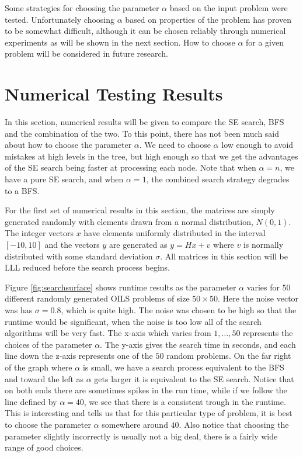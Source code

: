 \documentclass[12pt,Bold,letterpaper]{mcgilletdclass}
\newcommand{\vsp}{\vspace{\baselineskip}}
\begin{document}
Some strategies for choosing the parameter $\alpha$ based on the input problem were tested. Unfortunately choosing $\alpha$ based on properties of the problem has proven to be somewhat difficult, although it can be chosen reliably through numerical experiments as will be shown in the next section. How to choose $\alpha$ for a given problem will be considered in future research.

\vsp \section{Numerical Testing Results} \label{sub:SearchResults}
In this section, numerical results will be given to compare the SE search, BFS and the combination of the two. To this point, there has not been much said about how to choose the parameter $\alpha$. We need to choose $\alpha$ low enough to avoid mistakes at high levels in the tree, but high enough so that we get the advantages of the SE search being faster at processing each node. Note that when $\alpha = n$, we have a pure SE search, and when $\alpha = 1$, the combined search strategy degrades to a BFS. 

For the first set of numerical results in this section, the matrices are simply generated randomly with elements drawn from a normal distribution, $N(0,1)$. The integer vectors $x$ have elements uniformly distributed in the interval $[-10,10]$ and the vectors $y$ are generated as $y = Hx+v$ where $v$ is normally distributed with some standard deviation $\sigma$. All matrices in this section will be LLL reduced before the search process begins.

Figure \ref{fig:searchsurface} shows runtime results as the parameter $\alpha$ varies for $50$ different randomly generated OILS problems of size $50 \times 50$. Here the noise vector was has $\sigma = 0.8$, which is quite high. The noise was chosen to be high so that the runtime would be significant, when the noise is too low all of the search algorithms will be very fast. The x-axis which varies from $1 , \dots, 50$ represents the choices of the parameter $\alpha$. The y-axis gives the search time in seconds, and each line down the z-axis represents one of the $50$ random problems. On the far right of the graph where $\alpha$ is small, we have a search process equivalent to the BFS and toward the left as $\alpha$ gets larger it is equivalent to the  SE search. Notice that on both ends there are sometimes spikes in the run time, while if we follow the line defined by $\alpha = 40$, we see that there is a consistent trough in the runtime. This is interesting and tells us that for this particular type of problem, it is best to choose the parameter $\alpha$ somewhere around $40$. Also notice that choosing the parameter slightly incorrectly is usually not a big deal, there is a fairly wide range of good choices. 
\end{document}
